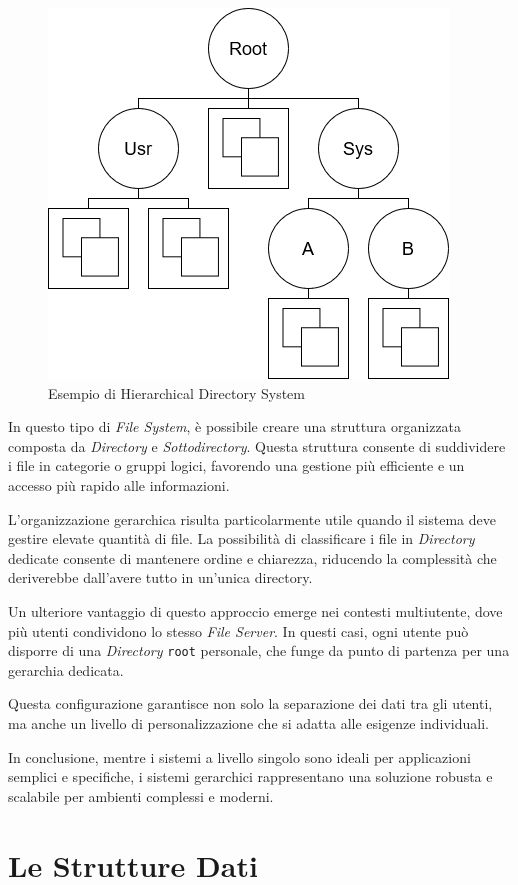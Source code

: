 \documentclass[12pt,a4paper,openright,twoside]{book}
\begin{document}
            \begin{figure} [h]
                \centering
                \includegraphics[width=.5\linewidth]{figures/MultipleDirSystem.png}
                \caption{Esempio di Hierarchical Directory System}
                \label{fig:hierarchical-directory}
            \end{figure}

            In questo tipo di \textit{File System}, è possibile creare una struttura organizzata composta da \textit{Directory} e \textit{Sottodirectory}. Questa struttura consente di suddividere i file in categorie o gruppi logici, favorendo una gestione più efficiente e un accesso più rapido alle informazioni.

            L'organizzazione gerarchica risulta particolarmente utile quando il sistema deve gestire elevate quantità di file. La possibilità di classificare i file in \textit{Directory} dedicate consente di mantenere ordine e chiarezza, riducendo la complessità che deriverebbe dall'avere tutto in un'unica directory.

            Un ulteriore vantaggio di questo approccio emerge nei contesti multiutente, dove più utenti condividono lo stesso \textit{File Server}. In questi casi, ogni utente può disporre di una \textit{Directory} \texttt{root} personale, che funge da punto di partenza per una gerarchia dedicata.

            Questa configurazione garantisce non solo la separazione dei dati tra gli utenti, ma anche un livello di personalizzazione che si adatta alle esigenze individuali.

    In conclusione, mentre i sistemi a livello singolo sono ideali per applicazioni semplici e specifiche, i sistemi gerarchici rappresentano una soluzione robusta e scalabile per ambienti complessi e moderni. \cite{tanenbaum2015modern}

    \section{Le Strutture Dati}
\end{document}
